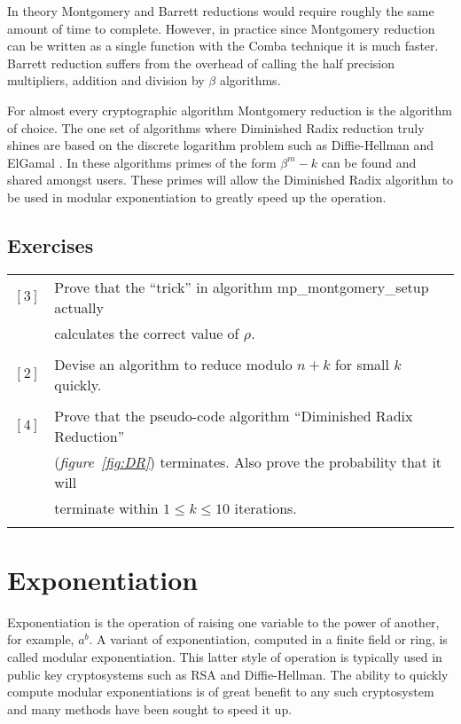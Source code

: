 \documentclass[b5paper]{book}
\begin{document}
In theory Montgomery and Barrett reductions would require roughly the same amount of time to complete.  However, in practice since Montgomery
reduction can be written as a single function with the Comba technique it is much faster.  Barrett reduction suffers from the overhead of
calling the half precision multipliers, addition and division by $\beta$ algorithms.

For almost every cryptographic algorithm Montgomery reduction is the algorithm of choice.  The one set of algorithms where Diminished Radix reduction truly
shines are based on the discrete logarithm problem such as Diffie-Hellman \cite{DH} and ElGamal \cite{ELGAMAL}.  In these algorithms
primes of the form $\beta^m - k$ can be found and shared amongst users.  These primes will allow the Diminished Radix algorithm to be used in
modular exponentiation to greatly speed up the operation.



\section*{Exercises}
\begin{tabular}{cl}
$\left [ 3 \right ]$ & Prove that the ``trick'' in algorithm mp\_montgomery\_setup actually \\
                     & calculates the correct value of $\rho$. \\
                     & \\
$\left [ 2 \right ]$ & Devise an algorithm to reduce modulo $n + k$ for small $k$ quickly.  \\
                     & \\
$\left [ 4 \right ]$ & Prove that the pseudo-code algorithm ``Diminished Radix Reduction'' \\
                     & (\textit{figure~\ref{fig:DR}}) terminates.  Also prove the probability that it will \\
                     & terminate within $1 \le k \le 10$ iterations. \\
                     & \\
\end{tabular}                     


\chapter{Exponentiation}
Exponentiation is the operation of raising one variable to the power of another, for example, $a^b$.  A variant of exponentiation, computed
in a finite field or ring, is called modular exponentiation.  This latter style of operation is typically used in public key 
cryptosystems such as RSA and Diffie-Hellman.  The ability to quickly compute modular exponentiations is of great benefit to any
such cryptosystem and many methods have been sought to speed it up.
\end{document}
